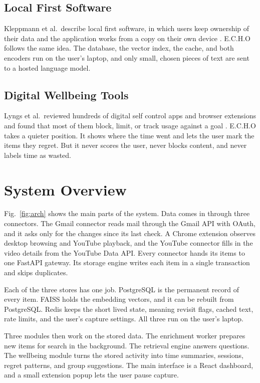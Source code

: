 \documentclass[conference]{IEEEtran}
\begin{document}
\subsection{Local First Software}
Kleppmann et al.\ describe local first software, in which users keep ownership of their data and the application works from a copy on their own device \cite{b12}. E.C.H.O follows the same idea. The database, the vector index, the cache, and both encoders run on the user's laptop, and only small, chosen pieces of text are sent to a hosted language model.

\subsection{Digital Wellbeing Tools}
Lyngs et al.\ reviewed hundreds of digital self control apps and browser extensions and found that most of them block, limit, or track usage against a goal \cite{b14}. E.C.H.O takes a quieter position. It shows where the time went and lets the user mark the items they regret. But it never scores the user, never blocks content, and never labels time as wasted.

\section{System Overview}\label{sec:overview}
Fig.~\ref{fig:arch} shows the main parts of the system. Data comes in through three connectors. The Gmail connector reads mail through the Gmail API with OAuth, and it asks only for the changes since its last check. A Chrome extension observes desktop browsing and YouTube playback, and the YouTube connector fills in the video details from the YouTube Data API. Every connector hands its items to one FastAPI gateway. Its storage engine writes each item in a single transaction and skips duplicates.

Each of the three stores has one job. PostgreSQL is the permanent record of every item. FAISS holds the embedding vectors, and it can be rebuilt from PostgreSQL. Redis keeps the short lived state, meaning revisit flags, cached text, rate limits, and the user's capture settings. All three run on the user's laptop.

Three modules then work on the stored data. The enrichment worker prepares new items for search in the background. The retrieval engine answers questions. The wellbeing module turns the stored activity into time summaries, sessions, regret patterns, and group suggestions. The main interface is a React dashboard, and a small extension popup lets the user pause capture.
\end{document}
